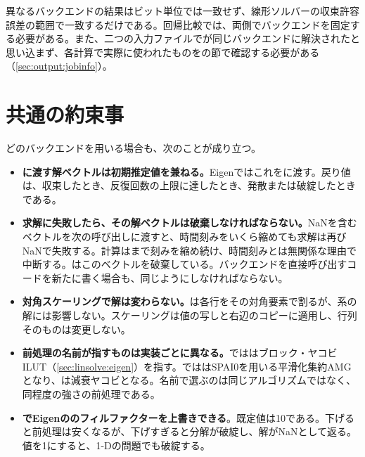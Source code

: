 \begin{warn}[バックエンドを変えると丸め誤差の現れ方が変わる]
  異なるバックエンドの結果はビット単位では一致せず、線形ソルバーの収束許容誤差の範囲で一致するだけである。回帰比較では、両側でバックエンドを固定する必要がある。また、二つの入力ファイルでが同じバックエンドに解決されたと思い込まず、各計算で実際に使われたものをの節で確認する必要がある（\cref{sec:output:jobinfo}）。
\end{warn}

\section{共通の約束事}
\label{sec:linsolve:contract}

どのバックエンドを用いる場合も、次のことが成り立つ。

\begin{itemize}
  \item \textbf{に渡す解ベクトルは初期推定値を兼ねる。}Eigenではこれをに渡す。戻り値は、収束したとき、反復回数の上限に達したとき、発散または破綻したときである。
  \item \textbf{求解に失敗したら、その解ベクトルは破棄しなければならない。}NaNを含むベクトルを次の呼び出しに渡すと、時間刻みをいくら縮めても求解は再びNaNで失敗する。計算はまで刻みを縮め続け、時間刻みとは無関係な理由で中断する。はこのベクトルを破棄している。バックエンドを直接呼び出すコードを新たに書く場合も、同じようにしなければならない。
  \item \textbf{対角スケーリングで解は変わらない。}は各行をその対角要素で割るが、系の解には影響しない。スケーリングは値の写しと右辺のコピーに適用し、行列そのものは変更しない。
  \item \textbf{前処理の名前が指すものは実装ごとに異なる。}でははブロック・ヤコビILUT（\cref{sec:linsolve:eigen}）を指す。でははSPAI0を用いる平滑化集約AMGとなり、は減衰ヤコビとなる。名前で選ぶのは同じアルゴリズムではなく、同程度の強さの前処理である。
  \item \textbf{でEigenののフィルファクターを上書きできる}。既定値は10である。下げると前処理は安くなるが、下げすぎると分解が破綻し、解がNaNとして返る。値を1にすると、1-Dの問題でも破綻する。
\end{itemize}
